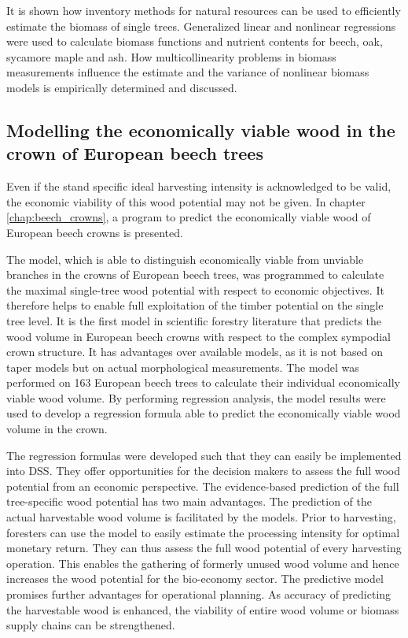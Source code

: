 It is shown how inventory methods for natural resources can be used to efficiently estimate the biomass of single trees. Generalized linear and nonlinear regressions were used to calculate biomass functions and nutrient contents for beech, oak, sycamore maple and ash. How multicollinearity problems in biomass measurements influence the estimate and the variance of nonlinear biomass models is empirically determined and discussed.

\subsection{Modelling the economically viable wood in the crown of European beech trees}
\label{subsec:intro:struct:beech_crowns}
Even if the stand specific ideal harvesting intensity is acknowledged to be valid, the economic viability of this wood potential may not be given. In chapter \ref{chap:beech_crowns}, a program to predict the economically viable wood of European beech crowns is presented.

The model, which is able to distinguish economically viable from unviable branches in the crowns of European beech trees, was programmed to calculate the maximal single-tree wood potential with respect to economic objectives. It therefore helps to enable full exploitation of the timber potential on the single tree level. It is the first model in scientific forestry literature that predicts the wood volume in European beech crowns with respect to the complex sympodial crown structure. It has advantages over available models, as it is not based on taper models but on actual morphological measurements. The model was performed on 163 European beech trees to calculate their individual economically viable wood volume. By performing regression analysis, the model results were used to develop a regression formula able to predict the economically viable wood volume in the crown.

The regression formulas were developed such that they can easily be implemented into DSS. They offer opportunities for the decision makers to assess the full wood potential from an economic perspective. The evidence-based prediction of the full tree-specific wood potential has two main advantages. The prediction of the actual harvestable wood volume is facilitated by the models. Prior to harvesting, foresters can use the model to easily estimate the processing intensity for optimal monetary return. They can thus assess the full wood potential of every harvesting operation. This enables the gathering of formerly unused wood volume and hence increases the wood potential for the bio-economy sector. The predictive model promises further advantages for operational planning. As accuracy of predicting the harvestable wood is enhanced, the viability of entire wood volume or biomass supply chains can be strengthened.

